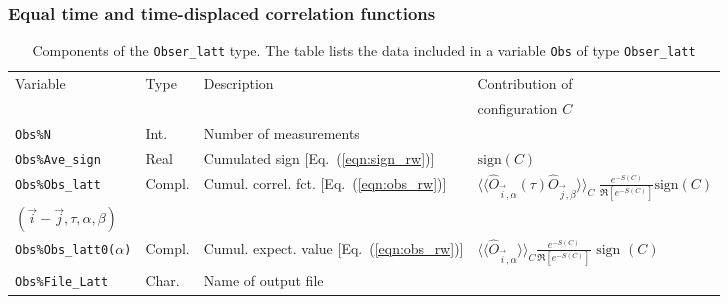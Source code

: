 \subsubsection{ Equal time and time-displaced correlation functions}
%
\begin{table}[h]
   \begin{tabular}{@{} l l l l @{}}\toprule
        Variable  &  Type      &  Description &  Contribution of  \\
        &  & & configuration $C$ \\\midrule
    \texttt{Obs\%N}                       &  Int.        &   Number of measurements &  \\
    \texttt{Obs\%Ave\_sign}  
    &  Real  &    Cumulated sign [Eq.~(\ref{eqn:sign_rw})] & $\text{sign}(C)$  \\
    \texttt{Obs\%Obs\_latt}        & Compl.      &    Cumul.  correl. fct. [Eq.~(\ref{eqn:obs_rw})] &  $ \langle \langle \hat{O}_{\vec{i},\alpha} (\tau) \hat{O}_{\vec{j},\beta} \rangle \rangle_{C} \; \frac{e^{-S(C)}} {\Re \left[e^{-S(C)} \right]}  \text{sign}(C) $ \\
     $(\vec{i}-\vec{j},\tau,\alpha,\beta)$ & & & \\
     \texttt{Obs\%Obs\_latt0($\alpha$)}        & Compl.      &    Cumul. expect. value [Eq.~(\ref{eqn:obs_rw})] &   $ \langle \langle \hat{O}_{\vec{i},\alpha} \rangle \rangle_{C}\frac{e^{-S(C)}} {\Re \left[e^{-S(C)} \right]}  \text{ sign }(C) $ \\
     \texttt{Obs\%File\_Latt}           &  Char.    &    Name of output file  &\\\bottomrule
   \end{tabular}
   \caption{Components of the \texttt{Obser\_latt}  type.  The table lists the data included in a variable  \texttt{Obs}  of type \texttt{Obser\_latt}  
      \label{table:Obser_latt}}
\end{table}
%

